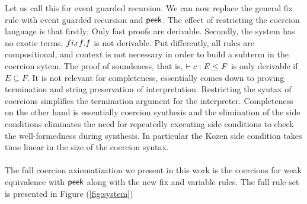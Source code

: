 \documentclass[a4paper,UKenglish,cleveref, autoref, thm-restate]{lipics-v2021}
\begin{document}
Let us call this for event guarded recursion.
We can now replace the general fix rule with event guarded recursion and $\textsf{peek}$. The effect of restricting the coercion language is that firstly; Only fast proofs are derivable. Secondly, the system has no exotic terms, $\fix f. f$ is not derivable. Put differently, all rules are compositional, and context is not necessary in order to build a subterm in the coercion sytem. The proof of soundeness, that is,  $\contains{}{c}{E}{F}$ is only derivable if $E \subseteq F$. It is not relevant for completeness, essentially comes down to proving termination and string preservation of interpretation. Restricting the syntax of coercions simplifies the termination argument for the interpreter. Completeness on the other hand is essentially coercion synthesis and the elimination of the side conditions eliminates the need for repeatedly executing side conditions to check the well-formedness during synthesis. In particular the Kozen side condition takes time linear in the size of the coercion syntax.\\\\
The full coercion axiomatization we present in this work is the coercions for weak equivalence with $\textsf{peek}$ along with the new fix and variable rules. The full rule set is presented in Figure (\ref{fig:system})
\end{document}
